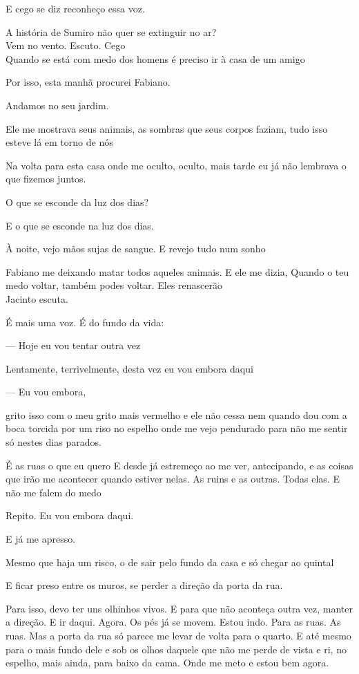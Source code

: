 E cego se diz reconheço essa voz.

A história de Sumiro não quer se extinguir no ar?\\

Vem no vento. Escuto. Cego\\

Quando se está com medo dos homens é preciso ir à casa de um amigo

Por isso, esta manhã procurei Fabiano.

Andamos no seu jardim.

Ele me mostrava seus animais, as sombras que seus corpos faziam, tudo
isso esteve lá em torno de nós

Na volta para esta casa onde me oculto, oculto, mais tarde eu já não
lembrava o que fizemos juntos.

O que se esconde da luz dos dias?

E o que se esconde na luz dos dias.

À noite, vejo mãos sujas de sangue. E revejo tudo num sonho

Fabiano me deixando matar todos aqueles animais. E ele me dizia, Quando
o teu medo voltar, também podes voltar. Eles renascerão\\

Jacinto escuta.

É mais uma voz. É do fundo da vida:

--- Hoje eu vou tentar outra vez

Lentamente, terrivelmente, desta vez eu vou embora daqui

--- Eu vou embora,

grito isso com o meu grito mais vermelho e ele não cessa nem quando dou
com a boca torcida por um riso no espelho onde me vejo pendurado para
não me sentir só nestes dias parados.

É as ruas o que eu quero E desde já estremeço ao me ver, antecipando, e
as coisas que irão me acontecer quando estiver nelas. As ruins e as
outras. Todas elas. E não me falem do medo

Repito. Eu vou embora daqui.

E já me apresso.

Mesmo que haja um risco, o de sair pelo fundo da casa e só chegar ao
quintal

E ficar preso entre os muros, se perder a direção da porta da rua.

Para isso, devo ter uns olhinhos vivos. E para que não aconteça outra
vez, manter a direção. E ir daqui. Agora. Os pés já se movem. Estou
indo. Para as ruas. As ruas. Mas a porta da rua só parece me levar de
volta para o quarto. E até mesmo para o mais fundo dele e sob os olhos
daquele que não me perde de vista e ri, no espelho, mais ainda, para
baixo da cama. Onde me meto e estou bem agora.

